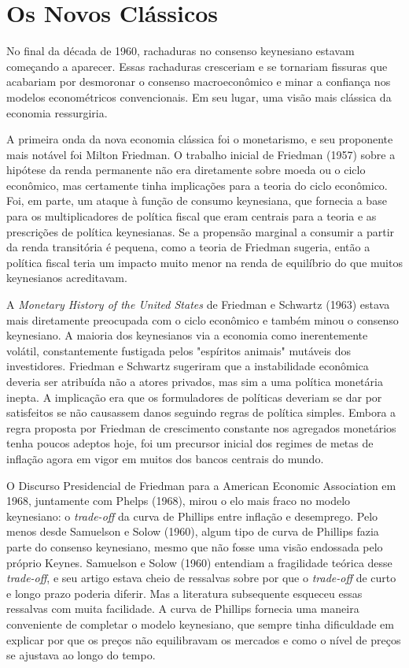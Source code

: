 \documentclass[12pt]{article}
\begin{document}
\section{Os Novos Clássicos}

No final da década de 1960, rachaduras no consenso keynesiano estavam começando a aparecer. Essas rachaduras cresceriam e se tornariam fissuras que acabariam por desmoronar o consenso macroeconômico e minar a confiança nos modelos econométricos convencionais. Em seu lugar, uma visão mais clássica da economia ressurgiria.

A primeira onda da nova economia clássica foi o monetarismo, e seu proponente mais notável foi Milton Friedman. O trabalho inicial de Friedman (1957) sobre a hipótese da renda permanente não era diretamente sobre moeda ou o ciclo econômico, mas certamente tinha implicações para a teoria do ciclo econômico. Foi, em parte, um ataque à função de consumo keynesiana, que fornecia a base para os multiplicadores de política fiscal que eram centrais para a teoria e as prescrições de política keynesianas. Se a propensão marginal a consumir a partir da renda transitória é pequena, como a teoria de Friedman sugeria, então a política fiscal teria um impacto muito menor na renda de equilíbrio do que muitos keynesianos acreditavam.

A \textit{Monetary History of the United States} de Friedman e Schwartz (1963) estava mais diretamente preocupada com o ciclo econômico e também minou o consenso keynesiano. A maioria dos keynesianos via a economia como inerentemente volátil, constantemente fustigada pelos "espíritos animais" mutáveis dos investidores. Friedman e Schwartz sugeriram que a instabilidade econômica deveria ser atribuída não a atores privados, mas sim a uma política monetária inepta. A implicação era que os formuladores de políticas deveriam se dar por satisfeitos se não causassem danos seguindo regras de política simples. Embora a regra proposta por Friedman de crescimento constante nos agregados monetários tenha poucos adeptos hoje, foi um precursor inicial dos regimes de metas de inflação agora em vigor em muitos dos bancos centrais do mundo.

O Discurso Presidencial de Friedman para a American Economic Association em 1968, juntamente com Phelps (1968), mirou o elo mais fraco no modelo keynesiano: o \textit{trade-off} da curva de Phillips entre inflação e desemprego. Pelo menos desde Samuelson e Solow (1960), algum tipo de curva de Phillips fazia parte do consenso keynesiano, mesmo que não fosse uma visão endossada pelo próprio Keynes. Samuelson e Solow (1960) entendiam a fragilidade teórica desse \textit{trade-off}, e seu artigo estava cheio de ressalvas sobre por que o \textit{trade-off} de curto e longo prazo poderia diferir. Mas a literatura subsequente esqueceu essas ressalvas com muita facilidade. A curva de Phillips fornecia uma maneira conveniente de completar o modelo keynesiano, que sempre tinha dificuldade em explicar por que os preços não equilibravam os mercados e como o nível de preços se ajustava ao longo do tempo.
\end{document}
